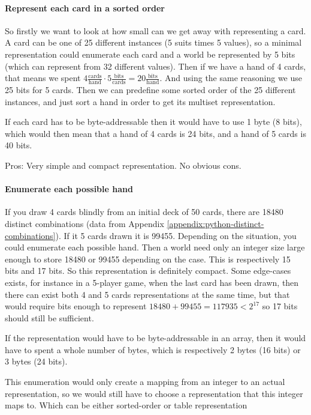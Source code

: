 \paragraph{Represent each card in a sorted order}
So firstly we want to look at how small can we get away with representing a card.
A card can be one of 25 different instances (5 suits times 5 values), so a minimal representation could enumerate each card and a world be represented by 5 bits (which can represent from 32 different values).
Then if we have a hand of 4 cards, that means we spent $4 \frac{\text{cards}}{\text{hand}} \cdot 5 \frac{\text{bits}}{\text{cards}} = 20 \frac{\text{bits}}{\text{hand}}$.
And using the same reasoning we use 25 bits for 5 cards.
Then we can predefine some sorted order of the 25 different instances, and just sort a hand in order to get its multiset representation.

If each card has to be byte-addressable then it would have to use 1 byte (8 bits), which would then mean that a hand of 4 cards is 24 bits, and a hand of 5 cards is 40 bits.

Pros: Very simple and compact representation.
No obvious cons.

\paragraph{Enumerate each possible hand}
If you draw 4 cards blindly from an initial deck of 50 cards, there are 18480 distinct combinations (data from Appendix \ref{appendix:python-distinct-combinations}). If it 5 cards drawn it is 99455. 
Depending on the situation, you could enumerate each possible hand.
Then a world need only an integer size large enough to store 18480 or 99455 depending on the case.
This is respectively 15 bits and 17 bits.
So this representation is definitely compact.
Some edge-cases exists, for instance in a 5-player game, when the last card has been drawn, then there can exist both 4 and 5 cards representations at the same time, but that would require bits enough to represent $18480+99455 = 117935 < 2^{17}$ so 17 bits should still be sufficient.

If the representation would have to be byte-addressable in an array, then it would have to spent a whole number of bytes, which is respectively 2 bytes (16 bits) or 3 bytes (24 bits).

This enumeration would only create a mapping from an integer to an actual representation, so we would still have to choose a representation that this integer maps to.
Which can be either sorted-order or table representation

